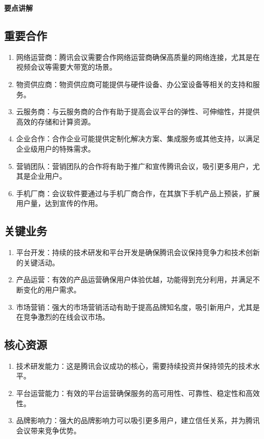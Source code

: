 \documentclass[a4paper,12pt]{article}
\begin{document}
\textbf{要点讲解}
\subsection{重要合作}
\begin{enumerate}
    \item 网络运营商：腾讯会议需要合作网络运营商确保高质量的网络连接，尤其是在视频会议等需要大带宽的场景。
    \item 物资供应商：物资供应商可能提供与硬件设备、办公室设备等相关的支持和服务。
    \item 云服务商：与云服务商的合作有助于提高会议平台的弹性、可伸缩性，并提供高效的存储和计算资源。
    \item 企业合作：合作企业可能提供定制化解决方案、集成服务或其他支持，以满足企业级用户的特殊需求。
    \item 营销团队：营销团队的合作将有助于推广和宣传腾讯会议，吸引更多用户，尤其是企业用户。
    \item 手机厂商：会议软件要通过与手机厂商合作，在其旗下手机产品上预装，扩展用户量，达到宣传的作用。
\end{enumerate}

\subsection{关键业务}
\begin{enumerate}
    \item 平台开发：持续的技术研发和平台开发是确保腾讯会议保持竞争力和技术创新的关键活动。
    \item 产品运营：有效的产品运营确保用户体验优越，功能得到充分利用，并满足不断变化的用户需求。
    \item 市场营销：强大的市场营销活动有助于提高品牌知名度，吸引新用户，尤其是在竞争激烈的在线会议市场。
\end{enumerate}

\subsection{核心资源}
\begin{enumerate}
    \item 技术研发能力：这是腾讯会议成功的核心，需要持续投资并保持领先的技术水平。
    \item 平台运营能力：有效的平台运营确保服务的高可用性、可靠性、稳定性和高效性。
    \item 品牌影响力：强大的品牌影响力可以吸引更多用户，建立信任关系，并为腾讯会议带来竞争优势。
\end{enumerate}
\end{document}
